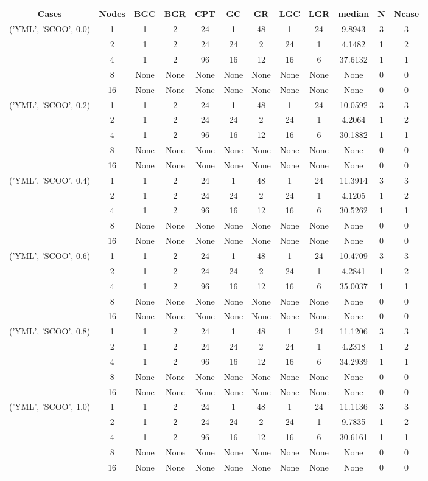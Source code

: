 \begin{tabular}{cccccccccccc}
\hline
Cases & Nodes& BGC& BGR& CPT& GC& GR& LGC& LGR& median & N & Ncase \\
\hline
\multirow{5}{*}{('YML', 'SCOO', 0.0)}& 1& 1& 2& 24& 1& 48& 1& 24& 9.8943& 3& 3\\
& 2& 1& 2& 24& 24& 2& 24& 1& 4.1482& 1& 2\\
& 4& 1& 2& 96& 16& 12& 16& 6& 37.6132& 1& 1\\
& 8& None& None& None& None& None& None& None& None& 0& 0\\
& 16& None& None& None& None& None& None& None& None& 0& 0\\
\hline
\multirow{5}{*}{('YML', 'SCOO', 0.2)}& 1& 1& 2& 24& 1& 48& 1& 24& 10.0592& 3& 3\\
& 2& 1& 2& 24& 24& 2& 24& 1& 4.2064& 1& 2\\
& 4& 1& 2& 96& 16& 12& 16& 6& 30.1882& 1& 1\\
& 8& None& None& None& None& None& None& None& None& 0& 0\\
& 16& None& None& None& None& None& None& None& None& 0& 0\\
\hline
\multirow{5}{*}{('YML', 'SCOO', 0.4)}& 1& 1& 2& 24& 1& 48& 1& 24& 11.3914& 3& 3\\
& 2& 1& 2& 24& 24& 2& 24& 1& 4.1205& 1& 2\\
& 4& 1& 2& 96& 16& 12& 16& 6& 30.5262& 1& 1\\
& 8& None& None& None& None& None& None& None& None& 0& 0\\
& 16& None& None& None& None& None& None& None& None& 0& 0\\
\hline
\multirow{5}{*}{('YML', 'SCOO', 0.6)}& 1& 1& 2& 24& 1& 48& 1& 24& 10.4709& 3& 3\\
& 2& 1& 2& 24& 24& 2& 24& 1& 4.2841& 1& 2\\
& 4& 1& 2& 96& 16& 12& 16& 6& 35.0037& 1& 1\\
& 8& None& None& None& None& None& None& None& None& 0& 0\\
& 16& None& None& None& None& None& None& None& None& 0& 0\\
\hline
\multirow{5}{*}{('YML', 'SCOO', 0.8)}& 1& 1& 2& 24& 1& 48& 1& 24& 11.1206& 3& 3\\
& 2& 1& 2& 24& 24& 2& 24& 1& 4.2318& 1& 2\\
& 4& 1& 2& 96& 16& 12& 16& 6& 34.2939& 1& 1\\
& 8& None& None& None& None& None& None& None& None& 0& 0\\
& 16& None& None& None& None& None& None& None& None& 0& 0\\
\hline
\multirow{5}{*}{('YML', 'SCOO', 1.0)}& 1& 1& 2& 24& 1& 48& 1& 24& 11.1136& 3& 3\\
& 2& 1& 2& 24& 24& 2& 24& 1& 9.7835& 1& 2\\
& 4& 1& 2& 96& 16& 12& 16& 6& 30.6161& 1& 1\\
& 8& None& None& None& None& None& None& None& None& 0& 0\\
& 16& None& None& None& None& None& None& None& None& 0& 0\\
\hline
\end{tabular}


